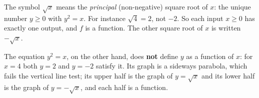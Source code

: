 The symbol $\sqrt{x}$ means the \emph{principal} (non-negative) square root of $x$: the unique number $y\ge0$ with $y^2=x$. For instance $\sqrt{4}=2$, not $-2$. So each input $x\ge0$ has exactly one output, and $f$ is a function. The other square root of $x$ is written $-\sqrt{x}$.

The equation $y^2=x$, on the other hand, does \textbf{not} define $y$ as a function of $x$: for $x=4$ both $y=2$ and $y=-2$ satisfy it. Its graph is a sideways parabola, which fails the vertical line test; its upper half is the graph of $y=\sqrt{x}$ and its lower half is the graph of $y=-\sqrt{x}$, and each half is a function.
